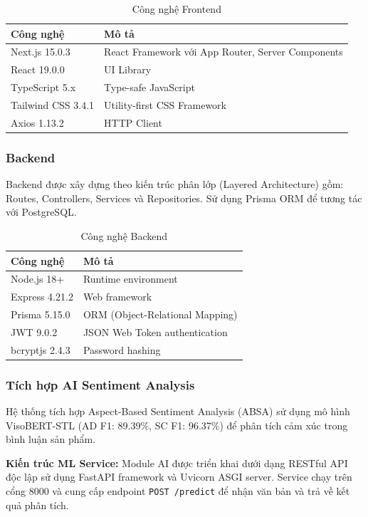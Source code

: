 \begin{table}[H]
\centering
\begin{tabular}{|l|l|}
\hline
\textbf{Công nghệ} & \textbf{Mô tả} \\
\hline
Next.js 15.0.3 & React Framework với App Router, Server Components \\
\hline
React 19.0.0 & UI Library \\
\hline
TypeScript 5.x & Type-safe JavaScript \\
\hline
Tailwind CSS 3.4.1 & Utility-first CSS Framework \\
\hline
Axios 1.13.2 & HTTP Client \\
\hline
\end{tabular}
\caption{Công nghệ Frontend}
\label{tab:frontend-tech}
\end{table}

\subsubsection{Backend}
Backend được xây dựng theo kiến trúc phân lớp (Layered Architecture) gồm: Routes, Controllers, Services và Repositories. Sử dụng Prisma ORM để tương tác với PostgreSQL.

\begin{table}[H]
\centering
\begin{tabular}{|l|l|}
\hline
\textbf{Công nghệ} & \textbf{Mô tả} \\
\hline
Node.js 18+ & Runtime environment \\
\hline
Express 4.21.2 & Web framework \\
\hline
Prisma 5.15.0 & ORM (Object-Relational Mapping) \\
\hline
JWT 9.0.2 & JSON Web Token authentication \\
\hline
bcryptjs 2.4.3 & Password hashing \\
\hline
\end{tabular}
\caption{Công nghệ Backend}
\label{tab:backend-tech}
\end{table}

\subsubsection{Tích hợp AI Sentiment Analysis}
Hệ thống tích hợp Aspect-Based Sentiment Analysis (ABSA) sử dụng mô hình VisoBERT-STL (AD F1: 89.39\%, SC F1: 96.37\%) để phân tích cảm xúc trong bình luận sản phẩm.

\textbf{Kiến trúc ML Service:} Module AI được triển khai dưới dạng RESTful API độc lập sử dụng FastAPI framework và Uvicorn ASGI server. Service chạy trên cổng 8000 và cung cấp endpoint \texttt{POST /predict} để nhận văn bản và trả về kết quả phân tích.

